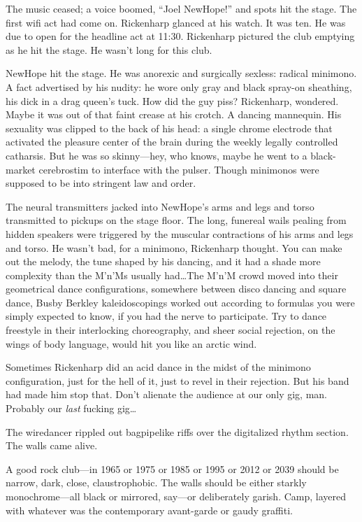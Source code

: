The music ceased; a voice boomed, ``Joel NewHope!'' and spots hit the stage. The first wifi act had come on. Rickenharp glanced at his watch. It was ten. He was due to open for the headline act at 11:30. Rickenharp pictured the club emptying as he hit the stage. He wasn't long for this club.

NewHope hit the stage. He was anorexic and surgically sexless: radical minimono. A fact advertised by his nudity: he wore only gray and black spray-on sheathing, his dick in a drag queen's tuck. How did the guy piss? Rickenharp, wondered. Maybe it was out of that faint crease at his crotch. A dancing mannequin. His sexuality was clipped to the back of his head: a single chrome electrode that activated the pleasure center of the brain during the weekly legally controlled catharsis. But he was so skinny---hey, who knows, maybe he went to a black-market cerebrostim to interface with the pulser. Though minimonos were supposed to be into stringent law and order.

The neural transmitters jacked into NewHope's arms and legs and torso transmitted to pickups on the stage floor. The long, funereal wails pealing from hidden speakers were triggered by the muscular contractions of his arms and legs and torso. He wasn't bad, for a minimono, Rickenharp thought. You can make out the melody, the tune shaped by his dancing, and it had a shade more complexity than the M'n'Ms usually had\ldots The M'n'M crowd moved into their geometrical dance configurations, somewhere between disco dancing and square dance, Busby Berkley kaleidoscopings worked out according to formulas you were simply expected to know, if you had the nerve to participate. Try to dance freestyle in their interlocking choreography, and sheer social rejection, on the wings of body language, would hit you like an arctic wind.

Sometimes Rickenharp did an acid dance in the midst of the minimono configuration, just for the hell of it, just to revel in their rejection. But his band had made him stop that. Don't alienate the audience at our only gig, man. Probably our \textit{last} fucking gig\ldots

The wiredancer rippled out bagpipelike riffs over the digitalized rhythm section. The walls came alive.

A good rock club---in 1965 or 1975 or 1985 or 1995 or 2012 or 2039 should be narrow, dark, close, claustrophobic. The walls should be either starkly monochrome---all black or mirrored, say---or deliberately garish. Camp, layered with whatever was the contemporary avant-garde or gaudy graffiti.

